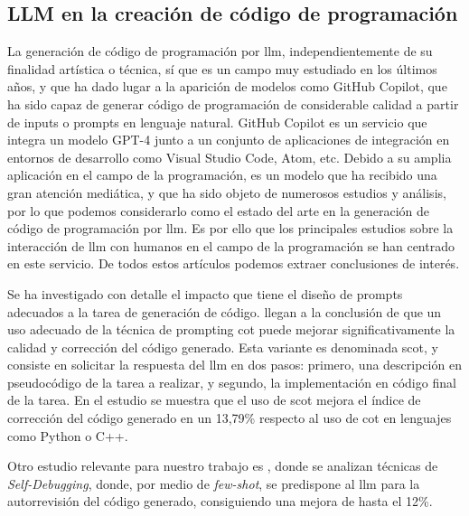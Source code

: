 \subsection{LLM en la creación de código de programación}
\label{sec:llm_creacion_codigo_programacion_estado_cuestion}

La generación de código de programación por \gls{llm}, independientemente de su finalidad artística o técnica, sí que es un campo muy estudiado en los últimos años, y que ha dado lugar a la aparición de modelos como {GitHub Copilot}, que ha sido capaz de generar código de programación de considerable calidad a partir de inputs o {prompts} en lenguaje natural. {GitHub Copilot} es un servicio que integra un modelo GPT-4 junto a un conjunto de aplicaciones de integración en entornos de desarrollo como {Visual Studio Code}, {Atom}, etc. Debido a su amplia aplicación en el campo de la programación, es un modelo que ha recibido una gran atención mediática, y que ha sido objeto de numerosos estudios y análisis, por lo que podemos considerarlo como el estado del arte en la generación de código de programación por \gls{llm}. Es por ello que los principales estudios sobre la interacción de \gls{llm} con humanos en el campo de la programación se han centrado en este servicio. De todos estos artículos podemos extraer conclusiones de interés.

Se ha investigado con detalle el impacto que tiene el diseño de prompts adecuados a la tarea de generación de código. \cite{liStructuredChainofThoughtPrompting2023} llegan a la conclusión de que un uso adecuado de la técnica de {prompting} \gls{cot} puede mejorar significativamente la calidad y corrección del código generado. Esta variante es denominada \gls{scot}, y consiste en solicitar la respuesta del \gls{llm} en dos pasos: primero, una descripción en pseudocódigo de la tarea a realizar, y segundo, la implementación en código final de la tarea. En el estudio se muestra que el uso de \gls{scot} mejora el índice de corrección del código generado en un 13,79\% respecto al uso de \gls{cot} en lenguajes como Python o C++.

Otro estudio relevante para nuestro trabajo es \cite{chenTeachingLargeLanguage2023}, donde se analizan técnicas de \emph{Self-Debugging}, donde, por medio de \emph{few-shot}, se predispone al \gls{llm} para la autorrevisión del código generado, consiguiendo una mejora de hasta el 12\%.

